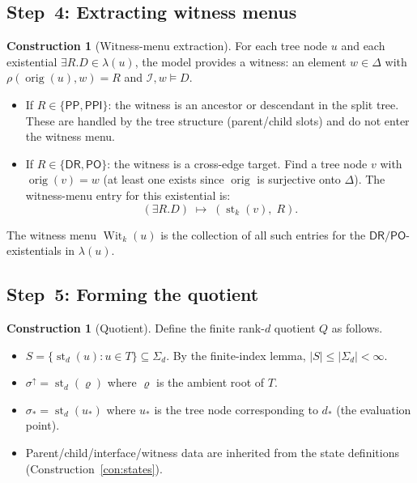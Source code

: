 \documentclass[11pt]{article}
\theoremstyle{definition}
\newtheorem{construction}[theorem]{Construction}
\theoremstyle{remark}
\newcommand{\DR}{\mathsf{DR}}
\newcommand{\PO}{\mathsf{PO}}
\newcommand{\PP}{\mathsf{PP}}
\newcommand{\PPI}{\mathsf{PPI}}
\newcommand{\st}{\operatorname{st}}
\newcommand{\orig}{\operatorname{orig}}
\newcommand{\Wit}{\operatorname{Wit}}
\begin{document}
\subsection{Step~4: Extracting witness menus}

\begin{construction}[Witness-menu extraction]\label{con:witness}
For each tree node $u$ and each existential
$\exists R.D\in\lambda(u)$, the model provides a witness:
an element $w\in\Delta$ with $\rho(\orig(u),w)=R$ and
$\mathcal{I},w\models D$.

\begin{itemize}
\item If $R\in\{\PP,\PPI\}$: the witness is an ancestor or descendant
  in the split tree.  These are handled by the tree structure
  (parent/child slots) and do not enter the witness menu.

\item If $R\in\{\DR,\PO\}$: the witness is a cross-edge target.
  Find a tree node $v$ with $\orig(v)=w$ (at least one exists since
  $\orig$ is surjective onto $\Delta$).  The witness-menu entry for
  this existential is:
  \[
  (\exists R.D) \;\mapsto\; (\st_k(v),\; R).
  \]
\end{itemize}

The witness menu $\Wit_k(u)$ is the collection of all such entries
for the $\DR/\PO$-existentials in $\lambda(u)$.
\end{construction}

\subsection{Step~5: Forming the quotient}

\begin{construction}[Quotient]\label{con:quotient}
Define the finite rank-$d$ quotient $Q$ as follows.
\begin{itemize}
\item $S = \{\st_d(u) : u\in T\} \subseteq \Sigma_d$.
  By the finite-index lemma, $|S|\le|\Sigma_d|<\infty$.
\item $\sigma^\uparrow = \st_d(\varrho)$ where $\varrho$ is the
  ambient root of $T$.
\item $\sigma_\ast = \st_d(u_\ast)$ where $u_\ast$ is the tree node
  corresponding to $d_\ast$ (the evaluation point).
\item Parent/child/interface/witness data are inherited from the
  state definitions (Construction~\ref{con:states}).
\end{itemize}
\end{construction}
\end{document}

